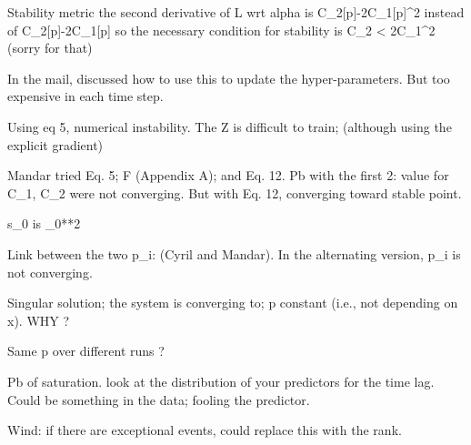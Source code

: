 Stability metric
the second derivative of \cal L wrt alpha is
 C_2[p]-2C_1[p]^2 instead of C_2[p]-2C_1[p] 
 so the necessary condition for stability is C_2 < 2C_1^2  (sorry for that)

In the mail, discussed how to use this to update the hyper-parameters.
But too expensive in each time step.

Using eq 5, numerical instability.
The Z is difficult to train; (although using the explicit gradient)

Mandar tried 
Eq. 5; F (Appendix A); and Eq. 12.
Pb with the first 2: value for C_1, C_2 were not converging.
But with Eq. 12, converging toward stable point.

s_0 is \sigma_0**2 

Link between the two p_i: (Cyril and Mandar).
In the alternating version, p_i is not converging. 

Singular solution; the system is converging to; \hat p constant (i.e., not depending on x). WHY ?

Same \hat p over different runs ?

Pb of saturation. look at the distribution of your predictors for the time lag.
Could be something in the data; fooling the predictor. 

Wind: 
if there are exceptional events, could replace this with the rank. 
